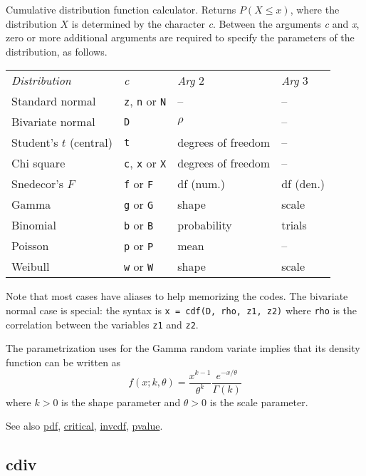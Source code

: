	  Cumulative distribution function calculator. Returns 
	  $P(X \le x)$, where the distribution \ensuremath{X} is
	  determined by the character \textsl{c}. Between the
	  arguments \textsl{c} and \textsl{x}, zero or
	  more additional arguments are required to specify the parameters
	  of the distribution, as follows.

	  \begin{center} 
	  \begin{tabular}{llll} 
	  \textit{Distribution} & \textsl{c} &
	  \textit{Arg} 2 & \textit{Arg} 3 \\[4pt] 
	  Standard normal & \texttt{z}, \texttt{n} or \texttt{N} & 
	  -- & -- \\ 
	  Bivariate normal & \texttt{D} & 
	  $\rho$ & -- \\ 
	  Student's $t$ (central) & \texttt{t} &  
	  degrees of freedom & -- \\ 
	  Chi square & \texttt{c}, \texttt{x} or \texttt{X} & 
	  degrees of freedom & -- \\ 
	  Snedecor's $F$ & \texttt{f} or \texttt{F} &
	  df (num.) & df (den.) \\ 
	  Gamma & \texttt{g} or \texttt{G} &
	  shape & scale \\ 
	  Binomial & \texttt{b} or \texttt{B} &
	  probability & trials \\ 
	  Poisson & \texttt{p} or \texttt{P} & 
	  mean & -- \\
	  Weibull & \texttt{w} or \texttt{W} & 
	  shape & scale
	  \end{tabular}
	  \end{center}

	  Note that most cases have aliases to help memorizing the codes.
	  The bivariate normal case is special: the syntax is \texttt{x =	    cdf(D, rho, z1, z2)} where \texttt{rho} is the
	  correlation between the variables \texttt{z1} and
	  \texttt{z2}.

	  The parametrization  uses for the Gamma random variate
	  implies that its density function can be written as
	  \[
	  f(x; k, \theta) = \frac{x^{k-1}}{\theta^k} \frac{e^{-x/\theta}}{\Gamma(k)}
	  \]
	  where $k>0$ is the shape parameter and $\theta>0$ is the scale
	  parameter.

	  See also \hyperlink{func-pdf}{pdf}, \hyperlink{func-critical}{critical}, \hyperlink{func-invcdf}{invcdf}, \hyperlink{func-pvalue}{pvalue}.

\subsection{cdiv}
\hypertarget{func-cdiv}{}

